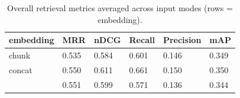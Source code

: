 \begin{table}
\caption{Overall retrieval metrics averaged across input modes (rows = embedding).}
\label{tab:overview-by-embedding}
\begin{tabular}{llllll}
\toprule
embedding & MRR & nDCG & Recall & Precision & mAP \\
\midrule
chunk & 0.535 & 0.584 & 0.601 & 0.146 & 0.349 \\
concat & 0.550 & 0.611 & 0.661 & 0.150 & 0.350 \\
 & 0.551 & 0.599 & 0.571 & 0.136 & 0.344 \\
\bottomrule
\end{tabular}
\end{table}
